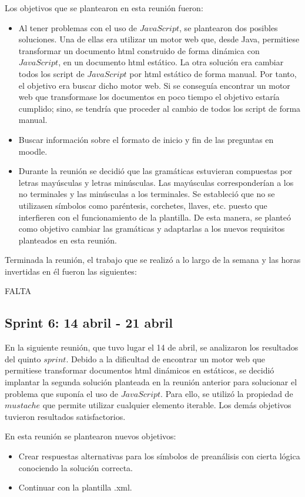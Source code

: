 Los objetivos que se plantearon en esta reunión fueron:
\begin{itemize}
\item Al tener problemas con el uso de $JavaScript$, se plantearon dos posibles soluciones. Una de ellas era utilizar un motor web que, desde Java, permitiese transformar un documento html construido de forma dinámica con $JavaScript$, en un documento html estático. La otra solución era cambiar todos los script de $JavaScript$ por html estático de forma manual. Por tanto, el objetivo era buscar dicho motor web. Si se conseguía encontrar un motor web que transformase los documentos en poco tiempo el objetivo estaría cumplido; sino, se tendría que proceder al cambio de todos los script de forma manual.
\item Buscar información sobre el formato de inicio y fin de las preguntas en moodle.
\item Durante la reunión se decidió que las gramáticas estuvieran compuestas por letras mayúsculas y letras minúsculas. Las mayúsculas corresponderían a los no terminales y las minúsculas a los terminales. Se estableció que no se utilizasen símbolos como paréntesis, corchetes, llaves, etc. puesto que interfieren con el funcionamiento de la plantilla. De esta manera, se planteó como objetivo cambiar las gramáticas y adaptarlas a los nuevos requisitos planteados en esta reunión.
\end{itemize}

Terminada la reunión, el trabajo que se realizó a lo largo de la semana y las horas invertidas en él fueron las siguientes:

FALTA

\subsection{Sprint 6: 14 abril - 21 abril}
En la siguiente reunión, que tuvo lugar el 14 de abril, se analizaron los resultados del quinto $sprint$. Debido a la dificultad de encontrar un motor web que permitiese transformar documentos html dinámicos en estáticos, se decidió implantar la segunda solución planteada en la reunión anterior para solucionar el problema que suponía el uso de $JavaScript$. Para ello, se utilizó la propiedad de $mustache$ que permite utilizar cualquier elemento iterable. Los demás objetivos tuvieron resultados satisfactorios.

En esta reunión se plantearon nuevos objetivos:
\begin{itemize}
\item Crear respuestas alternativas para los símbolos de preanálisis con cierta lógica conociendo la solución correcta.
\item Continuar con la plantilla .xml.
\end{itemize}


